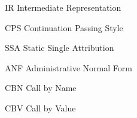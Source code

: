 
\listoffigures*
\cleardoublepage%

\lstlistoflistings
\cleardoublepage%




\begin{siglas}
    \item[IR] Intermediate Representation
    \item[CPS] Continuation Passing Style
    \item[SSA] Static Single Attribution
    \item[ANF] Administrative Normal Form
    \item[CBN] Call by Name
    \item[CBV] Call by Value
\end{siglas}




